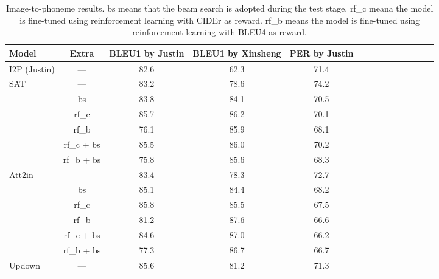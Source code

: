 \documentclass[journal,comsoc]{IEEEtran}
\begin{document}
\begin{table*}[htp]
\centering
\setlength{\tabcolsep}{1.2mm}
\caption{Image-to-phoneme results. bs means that the beam search is adopted during the test stage. rf\_c meana the model is fine-tuned using reinforcement learning with CIDEr as reward. rf\_b means the model is fine-tuned using reinforcement learning with BLEU4 as reward.}
\label{tab:image2phone}
\begin{tabular}{l|c|cccccccccccc}
\hline
Model                                     & \multicolumn{1}{c|}{Extra} & \multicolumn{1}{c}{BLEU1 by Justin} & \multicolumn{1}{c}{BLEU1 by Xinsheng} & \multicolumn{1}{c}{PER by Justin} \\ \hline
I2P (Justin)                                      & ---  & \multicolumn{1}{c}{82.6}  & \multicolumn{1}{c}{62.3}  & \multicolumn{1}{c}{71.4} \\ \hline
\multirow{6}{*}{SAT \cite{xu2015show}}  & ---      &   83.2   &  78.6 & 74.2 \\
                     & bs      &    83.8   &   84.1  & 70.5 \\
                      & rf\_c  &  85.7   &   86.2  & 70.1 \\
                      & rf\_b    &  76.1   &   85.9  & 68.1 \\
                     & rf\_c + bs   &   85.5   &   86.0 & 70.2 \\
                     & rf\_b + bs     &  75.8   &   85.6  & 68.3 \\ \hline
\multirow{6}{*}{Att2in \cite{rennie2017self}}         & ---     &   83.4   &   78.3  & 72.7 \\
                                          & bs   &  85.1   &   84.4 & 68.2\\
                                          & rf\_c    &   85.8   &   85.5 & 67.5\\
                                          & rf\_b     &  81.2   &   87.6 & 66.6 \\
                                          & rf\_c + bs   &   84.6   &   87.0 & 66.2\\
                                          & rf\_b + bs   &  77.3   &   86.7  & 66.7 \\ \hline
\multirow{6}{*}{Updown \cite{anderson2018bottom}}         & ---   &  85.6   &   81.2 & 71.3 \\

\end{tabular}
\end{table*}
\end{document}
